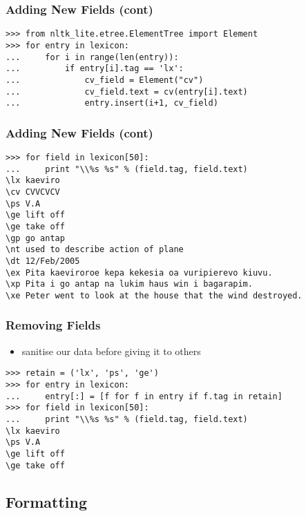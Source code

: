 \documentclass{beamer}             %
\begin{document}
\begin{frame}[fragile]
\frametitle{Adding New Fields (cont)}
\small

\begin{verbatim}
>>> from nltk_lite.etree.ElementTree import Element
>>> for entry in lexicon:
...     for i in range(len(entry)):
...         if entry[i].tag == 'lx':
...             cv_field = Element("cv")
...             cv_field.text = cv(entry[i].text)
...             entry.insert(i+1, cv_field)
\end{verbatim}
\end{frame}

\begin{frame}[fragile]
\frametitle{Adding New Fields (cont)}
\small
\begin{verbatim}
>>> for field in lexicon[50]:
...     print "\\%s %s" % (field.tag, field.text)
\lx kaeviro
\cv CVVCVCV
\ps V.A
\ge lift off
\ge take off
\gp go antap
\nt used to describe action of plane
\dt 12/Feb/2005
\ex Pita kaeviroroe kepa kekesia oa vuripierevo kiuvu.
\xp Pita i go antap na lukim haus win i bagarapim.
\xe Peter went to look at the house that the wind destroyed.
\end{verbatim}
\end{frame}

\begin{frame}[fragile]
\frametitle{Removing Fields}
\scriptsize

\begin{itemize}
\item sanitise our data before giving it to others
\end{itemize}

\small
\begin{verbatim}
>>> retain = ('lx', 'ps', 'ge')
>>> for entry in lexicon:
...     entry[:] = [f for f in entry if f.tag in retain]
>>> for field in lexicon[50]:
...     print "\\%s %s" % (field.tag, field.text)
\lx kaeviro
\ps V.A
\ge lift off
\ge take off
\end{verbatim}
\end{frame}

\subsection{Formatting}
\end{document}
